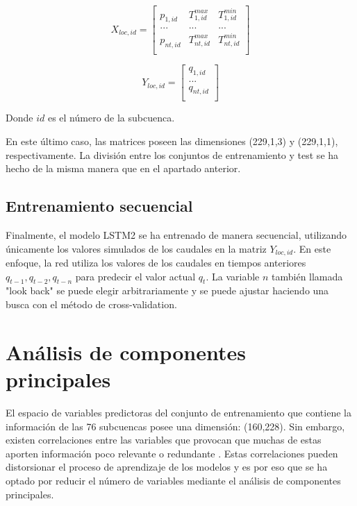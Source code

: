 \begin{equation*}
    X_{loc,id}= 
    \begin{bmatrix}
        p_{1,id} & T^{max}_{1,id} &  T^{min}_{1,id} \\
        ... & ... &  ... \\
        p_{nt,id} & T^{max}_{nt,id} &  T^{min}_{nt,id} \\
        \end{bmatrix}
\end{equation*}

\vspace{5mm}


\begin{equation*}
    Y_{loc,id}= 
    \begin{bmatrix}
        q_{1,id}  \\
        ...  \\
        q_{nt,id}  \\
        \end{bmatrix}
\end{equation*}

\vspace{5mm}

Donde $id$ es el número de la subcuenca. 
\vspace{5mm}

En este último caso, las matrices poseen las dimensiones (229,1,3) y (229,1,1), respectivamente. 
La división entre los conjuntos de entrenamiento y test se ha hecho de la misma manera que en el apartado anterior.

\subsection{Entrenamiento secuencial}

Finalmente, el modelo LSTM2 se ha entrenado de manera secuencial, utilizando únicamente los valores simulados de los caudales 
en la matriz $Y_{loc,id}$. En este enfoque, la red utiliza los valores de los caudales en tiempos anteriores
 $q_{t-1}, q_{t-2}, q_{t-n}$ para predecir el valor actual $q_{t}$. 
 La variable $n$ también llamada "look back" se puede elegir arbitrariamente y se puede ajustar haciendo 
 una busca con el método de cross-validation.


\section{Análisis de componentes principales}

El espacio de variables predictoras del conjunto de entrenamiento 
que contiene la información de las 76 subcuencas posee una dimensión: (160,228).
Sin embargo, existen correlaciones entre las variables que 
provocan que muchas de estas aporten información poco relevante o redundante \cite{Manu}. 
Estas correlaciones pueden distorsionar el proceso de aprendizaje de los modelos \cite{gutierrez} 
y es por eso que se ha optado por reducir el número de variables mediante el análisis de componentes principales\cite{PCA}.


